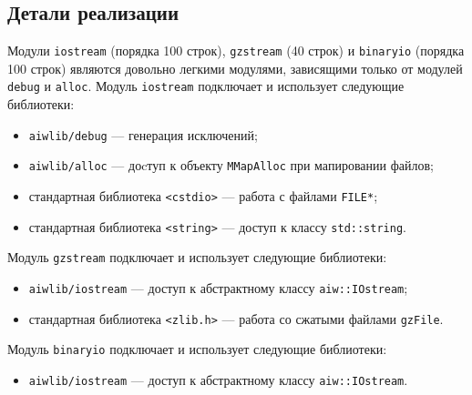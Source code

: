 \subsection{Детали реализации}
Модули \verb'iostream' (порядка 100 строк), \verb'gzstream' (40 строк) и \verb'binaryio' (порядка 100 строк)
являются довольно легкими модулями, зависящими только от модулей \verb'debug' и \verb'alloc'.
Модуль \verb'iostream' подключает и использует следующие библиотеки:
\begin{itemize}
\item \verb'aiwlib/debug' --- генерация исключений;
\item \verb'aiwlib/alloc' --- доcтуп к объекту \verb'MMapAlloc' при мапировании файлов;
\item стандартная библиотека \verb'<cstdio>' --- работа с файлами \verb'FILE*';
\item стандартная библиотека \verb'<string>' --- доступ к классу \verb'std::string'.
\end{itemize}
Модуль \verb'gzstream' подключает и использует следующие библиотеки:
\begin{itemize}
\item \verb'aiwlib/iostream' --- доступ к абстрактному классу \verb'aiw::IOstream';
\item стандартная библиотека \verb'<zlib.h>' --- работа со сжатыми файлами \verb'gzFile'.
\end{itemize}
Модуль \verb'binaryio' подключает и использует следующие библиотеки:
\begin{itemize}
\item \verb'aiwlib/iostream' --- доступ к абстрактному классу \verb'aiw::IOstream'.
\end{itemize}
